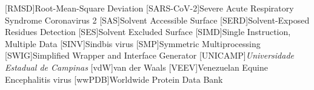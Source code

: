 \documentclass[Ingles]{phdthesis}
\begin{document}
\begin{acronym}
  [RMSD]{Root-Mean-Square Deviation}
  [SARS-CoV-2]{Severe Acute Respiratory Syndrome Coronavirus 2}
  [SAS]{Solvent Accessible Surface}
  [SERD]{Solvent-Exposed Residues Detection}
  [SES]{Solvent Excluded Surface}
  [SIMD]{Single Instruction, Multiple Data}
  [SINV]{Sindbis virus}
  [SMP]{Symmetric Multiprocessing}
  [SWIG]{Simplified Wrapper and Interface Generator}
  [UNICAMP]{\textit{Universidade Estadual de Campinas}}
  [vdW]{van der Waals}
  [VEEV]{Venezuelan Equine Encephalitis virus}
  [wwPDB]{Worldwide Protein Data Bank}
\end{acronym}

\clearpage




\clearpage

\tableofcontents

\fimdaspaginasiniciais

\end{document}
